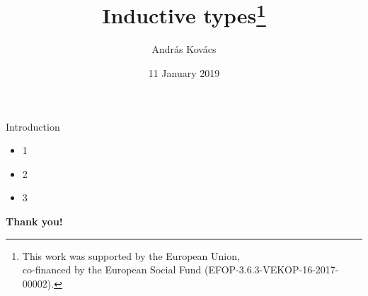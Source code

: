 \documentclass[bigger]{beamer}
\title{\bf Inductive types\thanks{This work was supported by the European Union,\\ co-financed by the European
    Social Fund (EFOP-3.6.3-VEKOP-16-2017-00002).}}}
\author{András Kovács}
\institute{Eötvös Loránd University (ELTE), \\ Budapest, Hungary}
\date{11 January 2019}
\begin{document}
{
%
\frame{\vspace{15mm}\titlepage}
}

\begin{frame}{Introduction}


\begin{itemize}
\item 1
\item 2
\item 3
\end{itemize}



\end{frame}


{
%
\begin{frame}{}

{\bf\large\color{white} Thank you!}

\end{frame}
}
\end{document}
